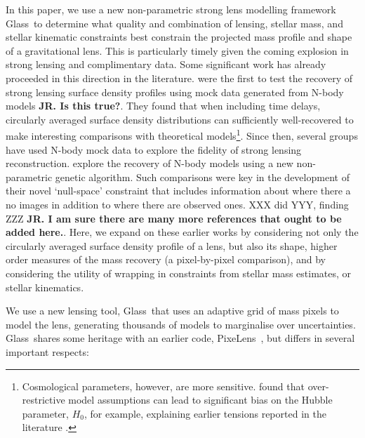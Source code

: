 \documentclass[galley]{mn2e}
\newcommand{\Glass}{{\sc Glass}}
\newcommand{\PixeLens}{{\sc PixeLens}}
\begin{document}

In this paper, we use a new non-parametric strong lens modelling framework \Glass\ to determine what quality and combination of lensing, stellar mass, and stellar kinematic constraints best constrain the projected mass profile and shape of a gravitational lens. This is particularly timely given the coming explosion in strong lensing and complimentary data. Some significant work has already proceeded in this direction in the literature. \citet{2007ApJ...667..645R} were the first to test the recovery of strong lensing surface density profiles using mock data generated from N-body models {\bf JR. Is this true?}. They found that when including time delays, circularly averaged surface density distributions can sufficiently well-recovered to make interesting comparisons with theoretical models\footnote{Cosmological parameters, however, are more sensitive. \citet{2007ApJ...667..645R} found that over-restrictive model assumptions can lead to significant bias on the Hubble parameter, $H_0$, for example, explaining earlier tensions reported in the literature \citep[e.g.][]{2002astro.ph..4043K}.}. Since then, several groups have used N-body mock data to explore the fidelity of strong lensing reconstruction. \citet{2007MNRAS.380.1729L} explore the recovery of N-body models using a new non-parametric genetic algorithm. Such comparisons were key in the development of their novel `null-space' constraint that includes information about where there a no images in addition to where there are observed ones. XXX did YYY, finding ZZZ {\bf JR. I am sure there are many more references that ought to be added here.}. Here, we expand on these earlier works by considering not only the circularly averaged surface density profile of a lens, but also its shape, higher order measures of the mass recovery (a pixel-by-pixel comparison), and by considering the utility of wrapping in constraints from stellar mass estimates, or stellar kinematics. 

We use a new lensing tool, \Glass\, that uses an adaptive grid of mass pixels to model the lens, generating thousands of models to marginalise over uncertainties. \Glass\ shares some heritage with an earlier code, \PixeLens\ \citep{1997MNRAS.292..148S,2008ApJ...679...17C}, but differs in several important respects: 
\end{document}
